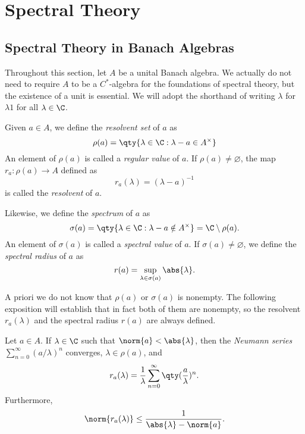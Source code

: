 
\section{Spectral Theory}
\label{sec:spectral-theory-c*-algebras}

\subsection{Spectral Theory in Banach Algebras}

Throughout this section, let $A$ be a unital Banach algebra. We actually do not need to require $A$ to be a $C^*$-algebra for the foundations of spectral theory, but the existence of a unit is essential. We will adopt the shorthand of writing $\lambda$ for $\lambda 1$ for all $\lambda \in \C$.

\begin{definition}
Given $a \in A$, we define the \emph{resolvent set} of $a$ as
\begin{equation}
\rho(a) = \qty{\lambda \in \C: \lambda - a \in A^\times}
\end{equation}
An element of $\rho(a)$ is called a \emph{regular value} of $a$. If $\rho(a) \neq \varnothing$, the map $r_a:\rho(a) \rightarrow A$ defined as
\begin{equation}
r_a(\lambda) = (\lambda - a)^{-1}
\end{equation}
is called the \emph{resolvent} of $a$.

Likewise, we define the \emph{spectrum} of $a$ as
\begin{equation}
\sigma(a) = \qty{\lambda \in \C: \lambda - a \notin A^\times} = \C \setminus \rho(a).
\end{equation}
An element of $\sigma(a)$ is called a \emph{spectral value} of $a$. If $\sigma(a) \neq \varnothing$, we define the \emph{spectral radius} of $a$ as
\begin{equation}
r(a) = \sup_{\lambda \in \sigma(a)} \abs{\lambda}.
\end{equation}
\end{definition}


A priori we do not know that $\rho(a)$ or $\sigma(a)$ is nonempty. The following exposition will establish that in fact both of them are nonempty, so the resolvent $r_a(\lambda)$ and the spectral radius $r(a)$ are always defined.

\begin{theorem}\label{thm:Neumann_series}
Let $a \in A$. If $\lambda \in \C$ such that $\norm{a} < \abs{\lambda}$, then the \emph{Neumann series} $\sum_{n=0}^\infty (a/\lambda)^n$ converges, $\lambda \in \rho(a)$, and
\begin{equation}
r_a(\lambda) = \frac{1}{\lambda}\sum_{n=0}^\infty \qty(\frac{a}{\lambda})^n.
\end{equation}
Furthermore,
\begin{equation}\label{eq:resolvent_norm_bound}
\norm{r_a(\lambda)} \leq \frac{1}{\abs{\lambda} - \norm{a}}.
\end{equation}
\end{theorem}

